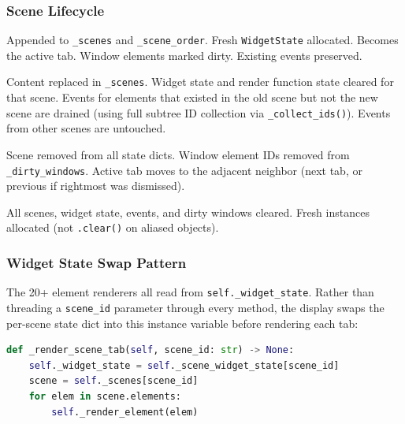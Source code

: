 \documentclass[a4paper,10pt]{article}
\newcommand{\msg}[1]{\texttt{#1}}
\newcommand{\field}[1]{\texttt{#1}}
\begin{document}
\subsubsection{Scene Lifecycle}

\begin{description}[style=nextline]
  \item[New scene (\field{scene\_id} not in \texttt{\_scenes})]
    Appended to \texttt{\_scenes} and \texttt{\_scene\_order}.
    Fresh \texttt{WidgetState} allocated.
    Becomes the active tab.  Window elements marked dirty.
    Existing events preserved.

  \item[Replace-in-place (same \field{scene\_id})]
    Content replaced in \texttt{\_scenes}.  Widget state and render
    function state cleared for that scene.  Events for elements
    that existed in the old scene but not the new scene are drained
    (using full subtree ID collection via \texttt{\_collect\_ids()}).
    Events from other scenes are untouched.

  \item[Dismiss (tab close button)]
    Scene removed from all state dicts.  Window element IDs removed
    from \texttt{\_dirty\_windows}.  Active tab moves to the adjacent
    neighbor (next tab, or previous if rightmost was dismissed).

  \item[Clear (\msg{ClearMessage} or menu)]
    All scenes, widget state, events,
    and dirty windows cleared.  Fresh instances allocated
    (not \texttt{.clear()} on aliased objects).
\end{description}

\subsubsection{Widget State Swap Pattern}

The 20+ element renderers all read from \texttt{self.\_widget\_state}.
Rather than threading a \field{scene\_id} parameter through every
method, the display swaps the per-scene state dict into this instance
variable before rendering each tab:

\begin{lstlisting}[language=Python]
def _render_scene_tab(self, scene_id: str) -> None:
    self._widget_state = self._scene_widget_state[scene_id]
    scene = self._scenes[scene_id]
    for elem in scene.elements:
        self._render_element(elem)
\end{lstlisting}
\end{document}
